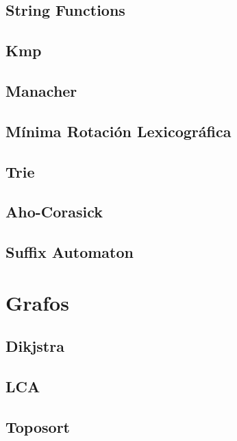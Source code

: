 \documentclass[a4paper,10pt,landscape,twocolumn]{article}
\begin{document}
\subsection{String Functions}

\subsection{Kmp}

\subsection{Manacher}

\subsection{Mínima Rotación Lexicográfica}

\subsection{Trie}

\subsection{Aho-Corasick}

\subsection{Suffix Automaton}


\section{Grafos} %
\subsection{Dikjstra}

\subsection{LCA}

% 
\subsection{Toposort}

\end{document}
